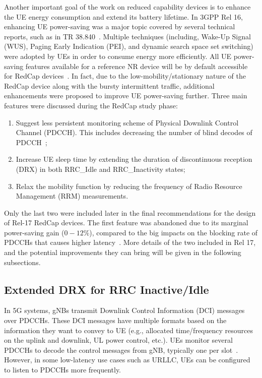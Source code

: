 \documentclass[]{IEEEtran}
\begin{document}
Another important goal of the work on reduced capability devices is to enhance the UE energy consumption and extend its battery lifetime. In 3GPP Rel 16, enhancing UE power-saving was a major topic covered by several technical reports, such as in TR 38.840~\cite{3gpp_study_2019_38.840}. Multiple techniques (including,  Wake-Up Signal (WUS), Paging Early Indication (PEI), and dynamic search space set switching) were adopted by UEs in order to consume energy more efficiently. All UE power-saving features available for a reference NR device will be by default accessible for RedCap devices~\cite{veedu_toward_2022_arXiv:2203.05634}.
In fact, due to the low-mobility/stationary nature of the RedCap device along with the bursty intermittent traffic, additional enhancements were proposed to improve UE power-saving further. Three main features were discussed during the RedCap study phase:
\begin{enumerate}
    \item Suggest less persistent monitoring scheme of Physical Downlink Control Channel (PDCCH). This includes decreasing the number of blind decodes of PDCCH~\cite{ratasuk_reduced_2021};
    \item   Increase UE sleep time by extending the duration of discontinuous reception (DRX) in both RRC\_Idle and RRC\_Inactivity states;
    \item   Relax the mobility function by reducing the frequency of Radio Resource Management (RRM) measurements. 
\end{enumerate}
Only the last two were included later in the final recommendations for the design of Rel-17 RedCap devices. The first feature was abandoned due to its marginal power-saving gain ($0-12\%$), compared to the big impacts on the blocking rate of PDCCHs that causes higher latency~\cite{ratasuk_reduced_2021}. More details of the two included in Rel 17, and the potential improvements they can bring will be given in the following subsections.

\subsection{Extended DRX for RRC Inactive/Idle}
\label{sec:5-1}

In 5G systems, gNBs transmit Downlink Control Information (DCI) messages over PDCCHs. 
These DCI messages have multiple formats based on the information they want to convey to UE (e.g., allocated time/frequency resources on the uplink and downlink, UL power control, etc.). 
UEs monitor several PDCCHs to decode the control messages from gNB, typically one per slot~\cite{3gpp_release_2019_21.915}. 
However, in some low-latency use cases such as URLLC, UEs can be configured to listen to PDCCHs more frequently.
\end{document}
